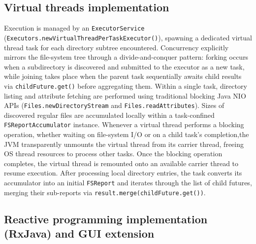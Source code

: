 \documentclass[11pt,a4paper]{article}
\begin{document}
\subsection{Virtual threads implementation}

Execution is managed by an \texttt{ExecutorService} (\texttt{Executors.newVirtualThreadPerTaskExecutor()}), spawning a dedicated virtual thread task for each directory subtree encountered. Concurrency explicitly mirrors the file-system tree through a divide-and-conquer pattern: forking occurs when a subdirectory is discovered and submitted to the executor as a new task, while joining takes place when the parent task sequentially awaits child results via \texttt{childFuture.get()} before aggregating them. Within a single task, directory listing and attribute fetching are performed using traditional blocking Java NIO APIs (\texttt{Files.newDirectoryStream} and \texttt{Files.readAttributes}). Sizes of discovered regular files are accumulated locally within a task-confined \texttt{FSReportAccumulator} instance. Whenever a virtual thread performs a blocking operation, whether waiting on file-system I/O or on a child task's completion,the JVM transparently unmounts the virtual thread from its carrier thread, freeing OS thread resources to process other tasks. Once the blocking operation completes, the virtual thread is remounted onto an available carrier thread to resume execution. After processing local directory entries, the task converts its accumulator into an initial \texttt{FSReport} and iterates through the list of child futures, merging their sub-reports via \texttt{result.merge(childFuture.get())}.

\subsection{Reactive programming implementation (RxJava) and GUI extension}
\end{document}
